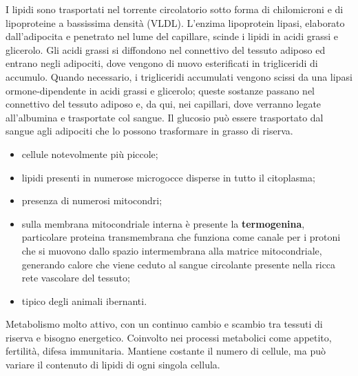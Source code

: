 I lipidi sono trasportati nel torrente circolatorio sotto forma di chilomicroni e di lipoproteine a bassissima densità (VLDL). L'enzima lipoprotein lipasi, elaborato dall'adipocita e penetrato nel lume del capillare, scinde i lipidi in acidi grassi e glicerolo. Gli acidi grassi si diffondono nel connettivo del tessuto adiposo ed entrano negli adipociti, dove vengono di nuovo esterificati in trigliceridi di accumulo. Quando necessario, i trigliceridi accumulati vengono scissi da una lipasi ormone-dipendente in acidi grassi e glicerolo; queste sostanze passano nel connettivo del tessuto adiposo e, da qui, nei capillari, dove verranno legate all'albumina e trasportate col sangue. Il glucosio può essere trasportato dal sangue agli adipociti che lo possono trasformare in grasso di riserva.

\begin{itemize}
  \item cellule notevolmente più piccole;
  \item lipidi presenti in numerose microgocce disperse in tutto il citoplasma;
  \item presenza di numerosi mitocondri;
  \item sulla membrana mitocondriale interna è presente la \textbf{termogenina}, particolare proteina transmembrana che funziona come canale per i protoni che si muovono dallo spazio intermembrana alla matrice mitocondriale, generando calore che viene ceduto al sangue circolante presente nella ricca rete vascolare del tessuto;
  \item tipico degli animali ibernanti.
\end{itemize}

Metabolismo molto attivo, con un continuo cambio e scambio tra tessuti di riserva e bisogno energetico. Coinvolto nei processi metabolici come appetito, fertilità, difesa immunitaria. Mantiene costante il numero di cellule, ma può variare il contenuto di lipidi di ogni singola cellula.

